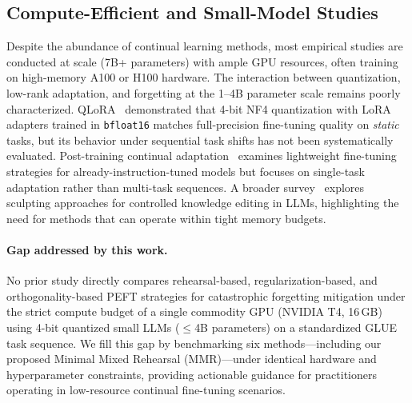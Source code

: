 \subsection{Compute-Efficient and Small-Model Studies}

Despite the abundance of continual learning methods, most empirical studies are conducted at scale
(7B+ parameters) with ample GPU resources, often training on high-memory A100 or H100 hardware.
The interaction between quantization, low-rank adaptation, and forgetting at the 1--4B parameter
scale remains poorly characterized.
QLoRA~\cite{dettmers2023qlora} demonstrated that 4-bit NF4 quantization with LoRA adapters trained
in \texttt{bfloat16} matches full-precision fine-tuning quality on \emph{static} tasks, but its
behavior under sequential task shifts has not been systematically evaluated.
Post-training continual adaptation~\cite{kumar2025posttraining} examines lightweight fine-tuning
strategies for already-instruction-tuned models but focuses on single-task adaptation rather than
multi-task sequences.
A broader survey~\cite{nayak2025sculpting} explores sculpting approaches for controlled knowledge
editing in LLMs, highlighting the need for methods that can operate within tight memory budgets.

\paragraph{Gap addressed by this work.}
No prior study directly compares rehearsal-based, regularization-based, and orthogonality-based
PEFT strategies for catastrophic forgetting mitigation under the strict compute budget of a single
commodity GPU (NVIDIA T4, 16\,GB) using 4-bit quantized small LLMs ($\leq$4B parameters) on a
standardized GLUE task sequence.
We fill this gap by benchmarking six methods---including our proposed Minimal Mixed Rehearsal
(MMR)---under identical hardware and hyperparameter constraints, providing actionable guidance for
practitioners operating in low-resource continual fine-tuning scenarios.

